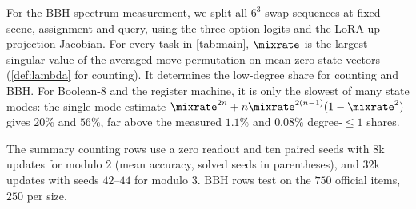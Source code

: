 
For the BBH spectrum measurement, we split all $6^3$ swap sequences at fixed scene, assignment and query, using the three option
logits and the LoRA up-projection Jacobian. For every task in \cref{tab:main}, $\mixrate$ is the largest singular value of the averaged
move permutation on mean-zero state vectors (\cref{def:lambda} for counting).
It determines the low-degree share for counting and BBH. For Boolean-8 and the register machine, it is only the slowest of many state modes:
the single-mode estimate $\mixrate^{2n}+n\mixrate^{2(n-1)}(1-\mixrate^2)$ gives $20\%$ and $56\%$, far above the measured
$1.1\%$ and $0.08\%$ degree-$\le1$ shares.

The summary counting rows use a zero readout and ten paired seeds with $8$k updates for modulo $2$ (mean accuracy, solved seeds in parentheses),
and $32$k updates with seeds $42$--$44$ for modulo $3$. BBH rows test on the $750$ official items, $250$ per size.

\begin{table}[H]
\centering\small
{}
\caption{\textbf{Step supervision usually helps when the answer has little low-degree signal.}
Held-out accuracy (\%); ranges are over seeds. Detailed protocols and per-seed values are in the accompanying code repository.}
\label{tab:main}
\end{table}

